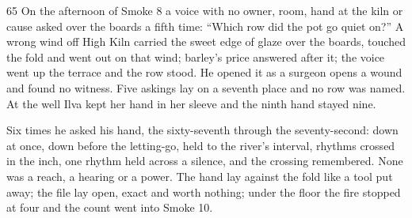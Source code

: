 \begin{CRchronicle}{65}
On the afternoon of Smoke 8 a voice with no owner, room, hand at the kiln or cause asked over the boards a fifth time: “Which row did the pot go quiet on?” A wrong wind off High Kiln carried the sweet edge of glaze over the boards, touched the fold and went out on that wind; barley’s price answered after it; the voice went up the terrace and the row stood. He opened it as a surgeon opens a wound and found no witness. Five askings lay on a seventh place and no row was named. At the well Ilva kept her hand in her sleeve and the ninth hand stayed nine.

Six times he asked his hand, the sixty-seventh through the seventy-second: down at once, down before the letting-go, held to the river’s interval, rhythms crossed in the inch, one rhythm held across a silence, and the crossing remembered. None was a reach, a hearing or a power. The hand lay against the fold like a tool put away; the file lay open, exact and worth nothing; under the floor the fire stopped at four and the count went into Smoke 10.
\end{CRchronicle}
